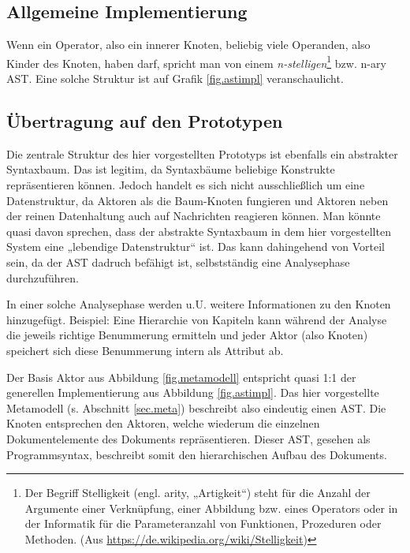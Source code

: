 \subsection{Allgemeine Implementierung}

Wenn ein Operator, also ein innerer Knoten, beliebig viele Operanden, also Kinder des Knoten,
haben darf, spricht man von einem
\emph{n-stelligen}\footnote{Der Begriff Stelligkeit (engl. arity, „Artigkeit“)
steht für die Anzahl der Argumente einer Verknüpfung, einer Abbildung bzw. eines
Operators oder in der Informatik für die Parameteranzahl von Funktionen,
Prozeduren oder Methoden. (Aus \url{https://de.wikipedia.org/wiki/Stelligkeit})}
bzw. n-ary AST. \citep{edwards}
Eine solche Struktur ist auf Grafik \ref{fig.astimpl} veranschaulicht.


\subsection{Übertragung auf den Prototypen}

Die zentrale Struktur des hier vorgestellten Prototyps ist ebenfalls ein abstrakter Syntaxbaum.
Das ist legitim, da Syntaxbäume beliebige Konstrukte repräsentieren können.
Jedoch handelt es sich nicht ausschließlich um eine Datenstruktur, da Aktoren als die
Baum-Knoten fungieren und Aktoren neben der reinen Datenhaltung auch auf Nachrichten reagieren können.
Man könnte quasi davon sprechen, dass der abstrakte Syntaxbaum in dem hier vorgestellten System
eine „lebendige Datenstruktur“ ist.
Das kann dahingehend von Vorteil sein, da der AST dadruch befähigt ist,
selbstständig eine Analysephase durchzuführen.

In einer solche Analysephase werden u.U. weitere Informationen zu den Knoten hinzugefügt.
Beispiel: Eine Hierarchie von Kapiteln kann während der Analyse die jeweils richtige
Benummerung ermitteln und jeder Aktor (also Knoten) speichert sich diese Benummerung
intern als Attribut ab.

Der Basis Aktor aus Abbildung \ref{fig.metamodell} entspricht quasi 1:1 der
generellen Implementierung aus Abbildung \ref{fig.astimpl}.
Das hier vorgestellte Metamodell (s. Abschnitt \ref{sec.meta}) beschreibt also eindeutig einen AST.
Die Knoten entsprechen den Aktoren, welche wiederum die einzelnen Dokumentelemente
des Dokuments repräsentieren.
Dieser AST, gesehen als Programmsyntax, beschreibt somit den hierarchischen Aufbau des Dokuments.

